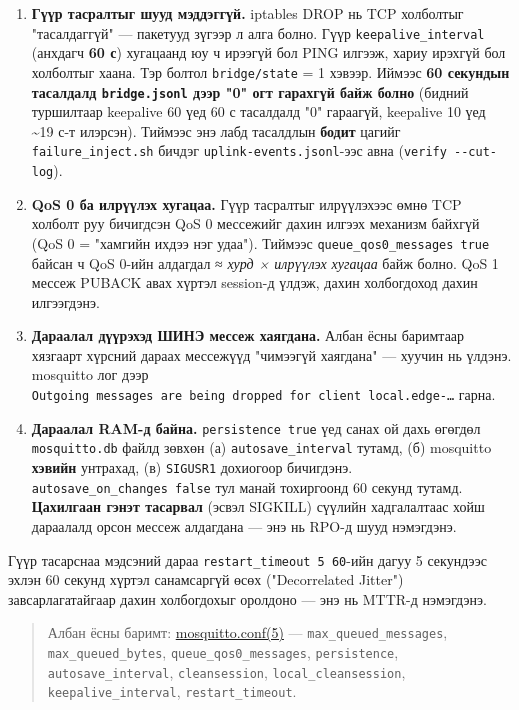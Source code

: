 \begin{enumerate}
\def\labelenumi{\arabic{enumi}.}
\tightlist
\item
  \textbf{Гүүр тасралтыг шууд мэддэггүй.} iptables DROP нь TCP холболтыг "тасалдаггүй" --- пакетууд зүгээр л алга болно. Гүүр \texttt{keepalive\_\allowbreak{}interval} (анхдагч \textbf{60 с}) хугацаанд юу ч ирээгүй бол PING илгээж, хариу ирэхгүй бол холболтыг хаана. Тэр болтол \texttt{bridge/state} = 1 хэвээр. Иймээс \textbf{60 секундын тасалдалд \texttt{bridge.jsonl} дээр "0" огт гарахгүй байж болно} (бидний туршилтаар keepalive 60 үед 60 с тасалдалд "0" гараагүй, keepalive 10 үед \textasciitilde19 с-т илэрсэн). Тиймээс энэ лабд тасалдлын \textbf{бодит} цагийг \texttt{failure\_\allowbreak{}inject.\allowbreak{}sh} бичдэг \texttt{uplink-events.\allowbreak{}jsonl}-ээс авна (\texttt{verify\ -\/\allowbreak{}-cut-log}).
\item
  \textbf{QoS 0 ба илрүүлэх хугацаа.} Гүүр тасралтыг илрүүлэхээс өмнө TCP холболт руу бичигдсэн QoS 0 мессежийг дахин илгээх механизм байхгүй (QoS 0 = "хамгийн ихдээ нэг удаа"). Тиймээс \texttt{queue\_\allowbreak{}qos0\_\allowbreak{}messages\ true} байсан ч QoS 0-ийн алдагдал ≈ \emph{хурд × илрүүлэх хугацаа} байж болно. QoS 1 мессеж PUBACK авах хүртэл session-д үлдэж, дахин холбогдоход дахин илгээгдэнэ.
\item
  \textbf{Дараалал дүүрэхэд ШИНЭ мессеж хаягдана.} Албан ёсны баримтаар хязгаарт хүрсний дараах мессежүүд "чимээгүй хаягдана" --- хуучин нь үлдэнэ. mosquitto лог дээр \texttt{Outgoing\ messages\ are\ being\ dropped\ for\ client\ local.\allowbreak{}edge-\ldots{}} гарна.
\item
  \textbf{Дараалал RAM-д байна.} \texttt{persistence\ true} үед санах ой дахь өгөгдөл \texttt{mosquitto.db} файлд зөвхөн (а) \texttt{autosave\_\allowbreak{}interval} тутамд, (б) mosquitto \textbf{хэвийн} унтрахад, (в) \texttt{SIGUSR1} дохиогоор бичигдэнэ. \texttt{autosave\_\allowbreak{}on\_\allowbreak{}changes\ false} тул манай тохиргоонд 60 секунд тутамд. \textbf{Цахилгаан гэнэт тасарвал} (эсвэл SIGKILL) сүүлийн хадгалалтаас хойш дараалалд орсон мессеж алдагдана --- энэ нь RPO-д шууд нэмэгдэнэ.
\end{enumerate}

Гүүр тасарснаа мэдсэний дараа \texttt{restart\_\allowbreak{}timeout\ 5\ 60}-ийн дагуу 5 секундээс эхлэн 60 секунд хүртэл санамсаргүй өсөх ("Decorrelated Jitter") завсарлагатайгаар дахин холбогдохыг оролдоно --- энэ нь MTTR-д нэмэгдэнэ.

\begin{quote}
Албан ёсны баримт: \href{https://mosquitto.org/man/mosquitto-conf-5.html}{mosquitto.conf(5)} --- \texttt{max\_\allowbreak{}queued\_\allowbreak{}messages}, \texttt{max\_\allowbreak{}queued\_\allowbreak{}bytes}, \texttt{queue\_\allowbreak{}qos0\_\allowbreak{}messages}, \texttt{persistence}, \texttt{autosave\_\allowbreak{}interval}, \texttt{cleansession}, \texttt{local\_\allowbreak{}cleansession}, \texttt{keepalive\_\allowbreak{}interval}, \texttt{restart\_timeout}.
\end{quote}

